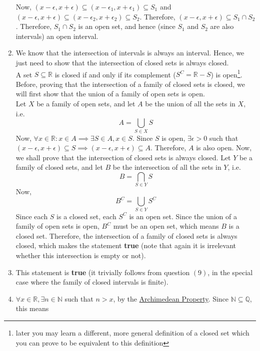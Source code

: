 \documentclass{article}
\begin{document}
\begin{enumerate}
	Now, $(x - \epsilon, x + \epsilon) \subseteq (x - \epsilon_{1}, x + \epsilon_{1}) \subseteq S_{1}$ and $(x - \epsilon, x + \epsilon) \subseteq (x - \epsilon_{2}, x + \epsilon_{2}) \subseteq S_{2}$. Therefore, $(x - \epsilon, x + \epsilon) \subseteq S_{1} \cap S_{2}$.
	Therefore, $S_{1} \cap S_{2}$ is an open set, and hence (since $S_{1}$ and $S_{2}$ are also intervals) an open interval.
	\item We know that the intersection of intervals is always an interval. Hence, we just need to show that the intersection of closed sets is always closed.
	\\ A set $S \subseteq \mathbb{R}$ is closed if and only if its complement ($S^{C} = \mathbb{R} - S$) is open\footnote[3]{later you may learn a different, more general definition of a closed set which you can prove to be equivalent to this definition}. 
	Before, proving that the intersection of a family of closed sets is closed, we will first show that the union of a family of open sets is open.
	\\Let $X$ be a family of open sets, and let $A$ be the union of all the sets in $X$, i.e.
	\begin{equation*}
		A = \bigcup_{S \in X} S
	\end{equation*}
	Now, $\forall x \in \mathbb{R}: x \in A \implies \exists S \in A, x \in S$. Since $S$ is open, $\exists \epsilon > 0$ such that $(x - \epsilon, x + \epsilon) \subseteq S \implies (x - \epsilon, x + \epsilon) \subseteq A$.
	Therefore, $A$ is also open.
	Now, we shall prove that the intersection of closed sets is always closed. Let $Y$ be a family of closed sets, and let $B$ be the intersection of all the sets in $Y$, i.e.
	\begin{equation*}
		B = \bigcap_{S \in Y} S
	\end{equation*}
	Now,
	\begin{equation*}
		B^{C} = \bigcup_{S \in Y} S^{C}
	\end{equation*}
	Since each $S$ is a closed set, each $S^{C}$ is an open set. Since the union of a family of open sets is open, $B^{C}$ must be an open set, which means $B$ is a closed set.
	Therefore, the intersection of a family of closed sets is always closed, which makes the statement \textbf{true} (note that again it is irrelevant whether this intersection is empty or not).
	\item This statement is \textbf{true} (it trivially follows from question $(9)$, in the special case where the family of closed intervals is finite).
	\item $\forall x \in \mathbb{R}, \exists n \in \mathbb{N}$ such that $n > x$, by the \href{https://en.wikipedia.org/wiki/Archimedean_property}{Archimedean Property}. Since $\mathbb{N} \subseteq \mathbb{Q}$, this means

\end{enumerate}
\end{document}

